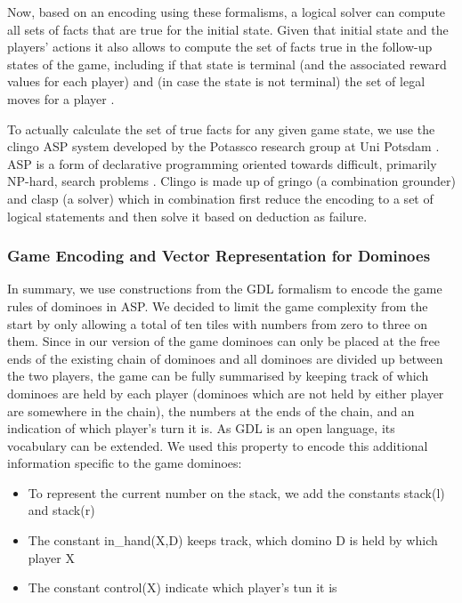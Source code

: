 \documentclass[12pt,a4paper]{article}
\begin{document}
Now, based on an encoding using these formalisms, a logical solver can compute all sets of facts that are true for the initial state. Given that initial state and the players’ actions it also allows to compute the set of facts true in the follow-up states of the game, including if that state is terminal (and the associated reward values for each player) and (in case the state is not terminal) the set of legal moves for a player \citep{love_general_2008}.

To actually calculate the set of true facts for any given game state, we use the clingo ASP system developed by the Potassco research group at Uni Potsdam \citet{gebser_clingo_2014}. ASP is a form of declarative programming oriented towards difficult, primarily NP-hard, search problems \citet{lifschitz_answer_2019}. Clingo is made up of gringo (a combination grounder) and clasp (a solver) which in combination first reduce the encoding to a set of logical statements and then solve it based on deduction as failure. 

\subsubsection{Game Encoding and Vector Representation for Dominoes}
\label{sec:game_encoding}
In summary, we use constructions from the GDL formalism to encode the game rules of dominoes in ASP.
We decided to limit the game complexity from the start by only allowing a total of ten tiles with numbers from zero to three on them. Since in our version of the game dominoes can only be placed at the free ends of the existing chain of dominoes and all dominoes are divided up between the two players, the game can be fully summarised by keeping track of which dominoes are held by each player (dominoes which are not held by either player are somewhere in the chain), the numbers at the ends of the chain, and an indication of which player’s turn it is. As GDL is an open language, its vocabulary can be extended. We used this property to encode this additional information specific to the game dominoes:

\begin{itemize}
\setlength\itemsep{0.01em}
  \item To represent the current number on the stack, we add the constants stack(l) and stack(r)
  \item The constant in\_hand(X,D) keeps track, which domino D is held by which player X
  \item The constant control(X) indicate which player’s tun it is
\end{itemize}
\end{document}
